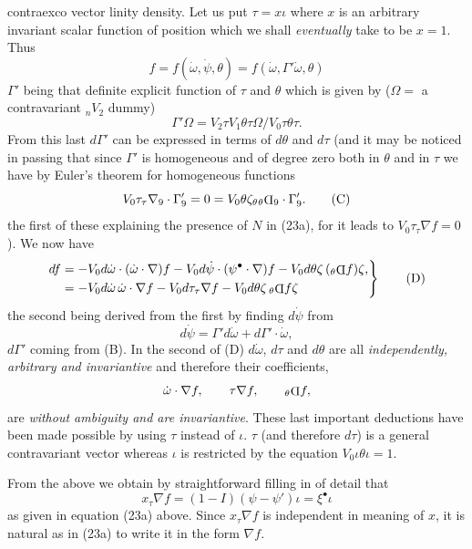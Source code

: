 \documentclass[11pt]{article}
\newcommand{\invd}{\mathord{\vcenter{\hbox{\rotatebox[origin=c]{180}{\(\mathrm{D}\)}}}}}
\newcommand{\thetaPi}{{}_\theta\invd}
\begin{document}
contraexco vector linity density. Let us put $\tau=x\iota$ where $x$ is an arbitrary invariant scalar function of position which we shall \emph{eventually} take to be $x=1$. Thus
\begin{equation}
  f=f(\dot\omega,\dot\psi,\theta)=f(\dot\omega,\Gamma'\dot\omega,\theta)
  \tag{A}
\end{equation}
$\Gamma'$ being that definite explicit function of $\tau$ and $\theta$ which is given by ($\Omega=$ a contravariant ${}_nV_2$ dummy)
\begin{equation}
  \Gamma'\Omega=V_2\tau V_1\theta\tau\Omega/V_0\tau\theta\tau.
  \tag{B}
\end{equation}
From this last $d\Gamma'$ can be expressed in terms of $d\theta$ and $d\tau$ (and it may be noticed in passing that since $\Gamma'$ is homogeneous and of degree zero both in $\theta$ and in $\tau$ we have by Euler's theorem for homogeneous functions
\begin{equation}
  V_0\tau_\tau\nabla_9\mathbin{\cdot}\Gamma_9'=0=V_0\theta\zeta_\theta\thetaPi_9\mathbin{\cdot}\Gamma_9'.
  \tag{C}
\end{equation}
the first of these explaining the presence of $N$ in (23a), for it leads to $V_0\tau_\tau\nabla f=0$). We now have
\begin{equation}
  \left.\begin{aligned}
    df&=-V_0d\dot\omega\mathbin{\cdot}(\dot\omega\mathbin{\cdot}\nabla)f-V_0d\dot\psi\mathbin{\cdot}(\psi^\bullet\mathbin{\cdot}\nabla)f-V_0d\theta\zeta\,(\thetaPi f)\zeta,\\
      &=-V_0d\dot\omega\,\dot\omega\mathbin{\cdot}\nabla f-V_0d\tau_\tau\nabla f-V_0d\theta\zeta\,\thetaPi f\zeta
  \end{aligned}\right\}
  \tag{D}
\end{equation}
the second being derived from the first by finding $d\dot\psi$ from
\[
  d\dot\psi=\Gamma'd\dot\omega+d\Gamma'\mathbin{\cdot}\dot\omega,
\]
$d\Gamma'$ coming from (B). In the second of (D) $d\dot\omega$, $d\tau$ and $d\theta$ are all \emph{independently, arbitrary and invariantive} and therefore their coefficients,
\[
  \dot\omega\mathbin{\cdot}\nabla f,\qquad \tau\nabla f,\qquad \thetaPi f,
\]
are \emph{without ambiguity and are invariantive}. These last important deductions have been made possible by using $\tau$ instead of $\iota$. $\tau$ (and therefore $d\tau$) is a general contravariant vector whereas $\iota$ is restricted by the equation $V_0\iota\theta\iota=1$.

\indent From the above we obtain by straightforward filling in of detail that
\[
  x_\tau\nabla f=(1-I)(\psi-\psi')\iota=\xi^\bullet\iota
\]
as given in equation (23a) above. Since $x_\tau\nabla f$ is independent in meaning of $x$, it is natural as in (23a) to write it in the form $\nabla f$.
\end{document}
